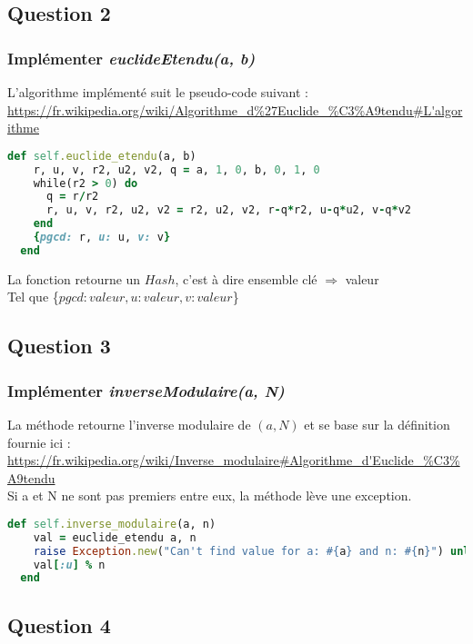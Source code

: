\documentclass[a4paper,10pt]{article}
\begin{document}
\subsection{Question 2}
\subsubsection{Implémenter \textit{euclideEtendu(a, b)}}
L'algorithme implémenté suit le pseudo-code suivant :\\
 \url{https://fr.wikipedia.org/wiki/Algorithme_d%27Euclide_%C3%A9tendu#L'algorithme}\\
 \begin{lstlisting}[language=Ruby]
   def self.euclide_etendu(a, b)
    r, u, v, r2, u2, v2, q = a, 1, 0, b, 0, 1, 0
    while(r2 > 0) do
      q = r/r2
      r, u, v, r2, u2, v2 = r2, u2, v2, r-q*r2, u-q*u2, v-q*v2
    end
    {pgcd: r, u: u, v: v}
  end
\end{lstlisting}
La fonction retourne un $Hash$, c'est à dire ensemble clé $\Rightarrow$ valeur\\
Tel que \{$pgcd: valeur, u: valeur, v: valeur$\}

\clearpage
\subsection{Question 3}
\subsubsection{Implémenter \textit{inverseModulaire(a, N)}}
La méthode retourne l'inverse modulaire de $(a, N)$ et se base sur la définition fournie ici :\\
\url{https://fr.wikipedia.org/wiki/Inverse_modulaire#Algorithme_d'Euclide_%C3%A9tendu}\\
Si a et N ne sont pas premiers entre eux, la méthode lève une exception.
\begin{lstlisting}[language=Ruby]
  def self.inverse_modulaire(a, n)
    val = euclide_etendu a, n
    raise Exception.new("Can't find value for a: #{a} and n: #{n}") unless val[:pgcd] == 1
    val[:u] % n
  end
\end{lstlisting}

\subsection{Question 4}
\end{document}
